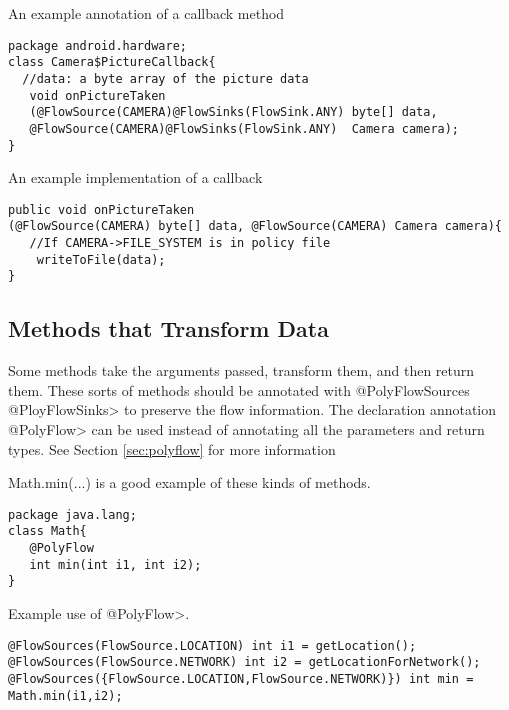 An example annotation of a callback method
\begin{Verbatim}
package android.hardware;
class Camera$PictureCallback{
  //data: a byte array of the picture data
   void onPictureTaken 
   (@FlowSource(CAMERA)@FlowSinks(FlowSink.ANY) byte[] data, 
   @FlowSource(CAMERA)@FlowSinks(FlowSink.ANY)  Camera camera);
}
\end{Verbatim}

An example implementation of a callback
\begin{Verbatim}
public void onPictureTaken
(@FlowSource(CAMERA) byte[] data, @FlowSource(CAMERA) Camera camera){
   //If CAMERA->FILE_SYSTEM is in policy file
    writeToFile(data);
}
\end{Verbatim}


\subsection{Methods that Transform Data}

Some methods take the arguments passed, transform them, and then return them.  These sorts of 
methods should be annotated with \<@PolyFlowSources @PloyFlowSinks>
  to preserve the flow information.  The declaration annotation \<@PolyFlow> can be used instead of
  annotating all the parameters and return types. See Section \ref{sec:polyflow} for more information 
  
  Math.min(...) is a good example of these kinds of methods. 
  
  \begin{Verbatim}
package java.lang;
class Math{
   @PolyFlow  
   int min(int i1, int i2);
}
\end{Verbatim}

Example use of \<@PolyFlow>.
\begin{Verbatim}
@FlowSources(FlowSource.LOCATION) int i1 = getLocation();
@FlowSources(FlowSource.NETWORK) int i2 = getLocationForNetwork();
@FlowSources({FlowSource.LOCATION,FlowSource.NETWORK)}) int min = Math.min(i1,i2);
 \end{Verbatim}



